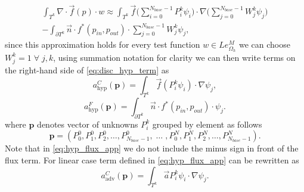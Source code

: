 \begin{multline}
\label{eq:disc_hyp_term}
\int_{T^k} \nabla\cdot \vec{f}(p)\cdot w \approx \int_{T^k} 
\vec{f}\Big(\sum\limits_{i=0}^{N_{base} - 1} 
P_i^k\psi_i\Big)\cdot\nabla\Big(\sum\limits_{j=0}^{N_{base} - 1} 
W_j^k\psi_j\Big)\\    
-\int_{\partial{T^k}} \vec{n} \cdot f^{*} (p_{in}, p_{out})\cdot 
\sum\limits_{j=0}^{N_{base} - 1} W_j^k\psi_j,
\end{multline}
since this approximation holds for every test function $w \in 
Le_{\Omega_h}^{M}$ we can choose $W_j^k = 1 \; \forall \; 
j, k$, using summation notation for clarity we can then write terms on the  right-hand 
side of \eqref{eq:disc_hyp_term} as 
\begin{equation}
\label{eq:hyp_stiff_app}
a^C_\mathrm{hyp}(\mathbf{p}) = \int_{T^k} \vec{f}(P_i^k\psi_i)\cdot\nabla\psi_j, 
\end{equation}
\begin{equation}
\label{eq:hyp_flux_app}
a^F_\mathrm{hyp}(\mathbf{p}) = \int_{\partial{T^k}} \vec{n} \cdot f^{*} (p_{in}, 
p_{out})\cdot\psi_j.
\end{equation}
where $\mathbf{p}$ denotes vector of unknowns $P^k_i$ grouped by element as follows
\begin{equation}
\mathbf{p} = \left(P^0_0, P^0_1, P^0_2, \ldots, P^0_{N_{base}-1}, \; \ldots \; ,
P^{N}_0, P^{N}_1, P^{N}_2, \ldots, P^{N}_{N_{base} - 1}  \right).
\end{equation}
Note that in \eqref{eq:hyp_flux_app} we do not include the minus sign in front 
of the flux term. For linear case term defined in \eqref{eq:hyp_flux_app} can be 
rewritten as
\begin{equation}
a^C_\mathrm{adv}(\mathbf{p}) = \int_{T^k} \vec{a}P_i^k\psi_i\cdot\nabla\psi_j.
\end{equation} 


